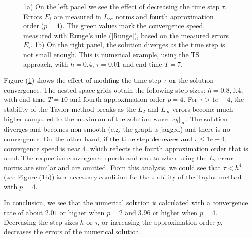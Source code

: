 \documentclass[%
 aip,
cp,  
 amsmath,amssymb,
 reprint,
]{iopconfser}
\newcommand{\rf}[1]{(\ref{#1})}
\begin{document}
\begin{figure}
	\caption{\ref{figConvSeq}a) On the left panel we see the effect of decreasing the time step $\tau$. Errors $E_i$ are measured in $L_\infty$ norms and fourth approximation order ($p=4$). The green values mark the convergence speed, measured with Runge's rule \rf{Runge}, based on the measured errors $E_i$. 
\ref{figConvSeq}b) On the right panel, the solution diverges as the time step is not small enough. This is numerical example, using the TS approach, with $h=0.4$, $\tau = 0.01$ and end time $T=7$.}
	\label{figConvSeq}
\end{figure}

Figure \rf{figConvSeq} shows the effect of modifing the time step $\tau$ on the solution convergence. The nested space grids obtain the following step sizes: $h=0.8, 0.4$, with end time $T=10$ and fourth approximation order $p=4$. For $\tau>1e-4$, the stability of the Taylor method breaks as the $L_2$ and $L_\infty$ errors become much higher compared to the maximum of the solution wave $|u_h|_\infty$. The solution diverges and becomes non-smooth (e.g. the graph is jagged) and there is no convergence. On the other hand, if the time step decreases and $\tau \le 1e-4$, convergence speed is near 4, which reflects the fourth approximation order that is used. The respective convergence speeds and results when using the $L_2$ error norms are similar and are omitted. From this analysis, we could see that $\tau < h^4$ (see Figure (\ref{figConvSeq}b)) is a necessary condition for the stability of the Taylor method with $p=4$.

In conclusion, we see that the numerical solution is calculated with a convergence rate of about $2.01$ or higher when $p=2$ and $3.96$ or higher when $p=4$. Decreasing the step sizes $h$ or $\tau$, or increasing the approximation order $p$, decreases the errors of the numerical solution.
\end{document}
